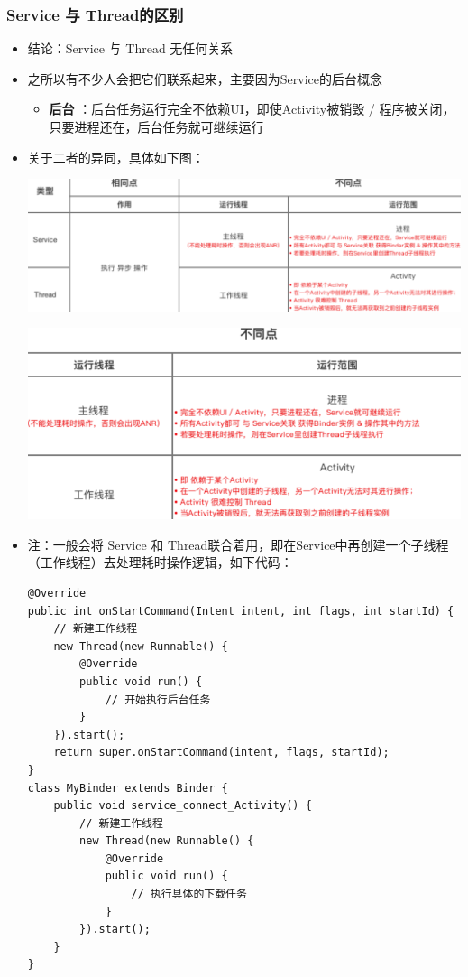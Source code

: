 \documentclass[9pt, b5paper]{article}
\begin{document}
\subsubsection{Service 与 Thread的区别}
\label{sec-2-7-1}
\begin{itemize}
\item 结论：Service 与 Thread 无任何关系
\item 之所以有不少人会把它们联系起来，主要因为Service的后台概念
\begin{itemize}
\item \textbf{后台} ：后台任务运行完全不依赖UI，即使Activity被销毁 / 程序被关闭，只要进程还在，后台任务就可继续运行
\end{itemize}
\item 关于二者的异同，具体如下图：

\includegraphics[width=.9\linewidth]{./pic/serviceThreadDiff.png}

\includegraphics[width=.9\linewidth]{./pic/diff.png}
\item 注：一般会将 Service 和 Thread联合着用，即在Service中再创建一个子线程（工作线程）去处理耗时操作逻辑，如下代码：
\begin{verbatim}
@Override  
public int onStartCommand(Intent intent, int flags, int startId) {  
    // 新建工作线程
    new Thread(new Runnable() {  
        @Override  
        public void run() {  
            // 开始执行后台任务  
        }  
    }).start();  
    return super.onStartCommand(intent, flags, startId);  
}  
class MyBinder extends Binder {  
    public void service_connect_Activity() {  
        // 新建工作线程
        new Thread(new Runnable() {  
            @Override  
            public void run() {  
                // 执行具体的下载任务  
            }  
        }).start();  
    }  
}
\end{verbatim}
\end{itemize}
\end{document}

